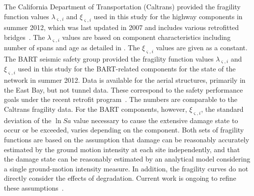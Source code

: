 The California Department of Transportation (Caltrans) provided the fragility function values $\lambda_{\varsigma,i}$ and $\xi_{\varsigma,i}$ used in this study for the highway components in summer 2012, which was last updated in 2007 and includes various retrofitted bridges~\cite{caltrans_caltrans_2013}. The $\lambda_{\varsigma,i}$ values are based on component characteristics including number of spans and age as detailed in \cite{basoz_enhancement_1999}. The $\xi_{\varsigma,i}$ values are given as a constant. The BART seismic safety group provided the  fragility function values $\lambda_{\varsigma,i}$ and $\xi_{\varsigma,i}$ used in this study for the BART-related components for the state of the network in summer 2012. Data is available for the aerial structures, primarily in the East Bay, but not tunnel data. These correspond to the safety performance goals under the recent retrofit program~\cite{bechtel/hntb_team_design_2008}. The numbers are comparable to the Caltrans fragility data. For the BART components, however, $\xi_{\varsigma,i}$, the standard deviation of the $\ln Sa$ value necessary to cause the extensive damage state to occur or be exceeded, varies depending on the component. Both sets of fragility functions are based on the assumption that damage can be reasonably accurately estimated by the ground motion intensity at each site independently, and that the damage state can be reasonably estimated by an analytical model considering a single ground-motion intensity measure.  In addition, the fragility curves do not directly consider the effects of degradation. Current work is ongoing to refine these assumptions~\cite[e.g.,][]{ramanathan_next_2012,kurtz_time-varying_2014,ghosh_seismic_2013}. 



%


